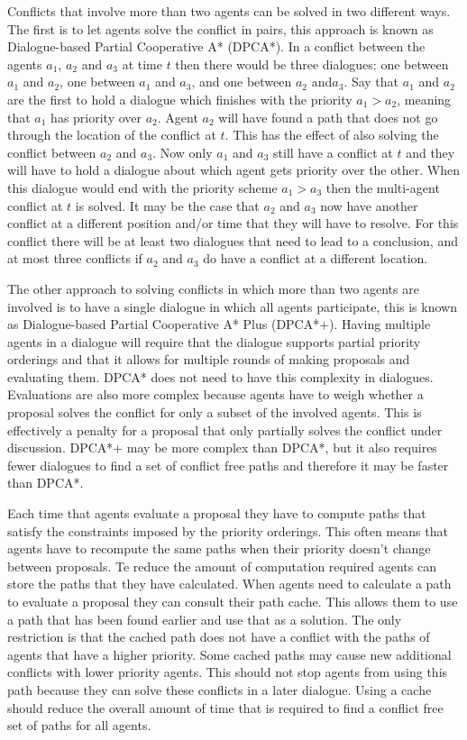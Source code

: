 Conflicts that involve more than two agents can be solved in two different
ways. The first is to let agents solve the conflict in pairs, this approach is
known as Dialogue-based Partial Cooperative A* (DPCA*). In a conflict between
the agents $a_1$, $a_2$ and $a_3$ at time $t$ then there would be three
dialogues: one between $a_1$ and $a_2$, one between $a_1$ and $a_3$, and one
between $a_2$ and$a_3$. Say that $a_1$ and $a_2$ are the first to hold a
dialogue which finishes with the priority $a_1 > a_2$, meaning that $a_1$ has
priority over $a_2$. Agent $a_2$ will have found a path that does not go
through the location of the conflict at $t$. This has the effect of also
solving the conflict between $a_2$ and $a_3$. Now only $a_1$ and $a_3$ still
have a conflict at $t$ and they will have to hold a dialogue about which agent
gets priority over the other. When this dialogue would end with the priority
scheme $a_1 > a_3$ then the multi-agent conflict at $t$ is solved. It may be
the case that $a_2$ and $a_3$ now have another conflict at a different position
and/or time that they will have to resolve. For this conflict there will be at
least two dialogues that need to lead to a conclusion, and at most three
conflicts if $a_2$ and $a_3$ do have a conflict at a different location.

The other approach to solving conflicts in which more than two agents are 
involved is to have a single dialogue in which all agents
participate, this is known as Dialogue-based Partial Cooperative A* Plus
(DPCA*+). Having multiple agents in a dialogue will require that the dialogue
supports partial priority orderings and that it allows for multiple rounds of
making proposals and evaluating them. DPCA* does not need to have this
complexity in dialogues. Evaluations are also more complex because agents have 
to weigh whether a proposal solves the conflict for only a subset of the 
involved agents. This is effectively a penalty for a proposal that only 
partially solves the conflict under discussion.
DPCA*+ may be more complex than DPCA*, but it also
requires fewer dialogues to find a set of conflict free paths and therefore it
may be faster than DPCA*.

Each time that agents evaluate a proposal they have to compute paths that
satisfy the constraints imposed by the priority orderings. This often means
that agents have to recompute the same paths when their priority doesn't change
between proposals. Te reduce the amount of computation required agents can
store the paths that they have calculated. When agents need to calculate a path
to evaluate a proposal they can consult their path cache. This allows them to
use a path that has been found earlier and use that as a solution. The only
restriction is that the cached path does not have a conflict with the paths of
agents that have a higher priority. Some cached paths may cause new additional
conflicts with lower priority agents. This should not stop agents from using
this path because they can solve these conflicts in a later dialogue. Using a
cache should reduce the overall amount of time that is required to find a
conflict free set of paths for all agents.

